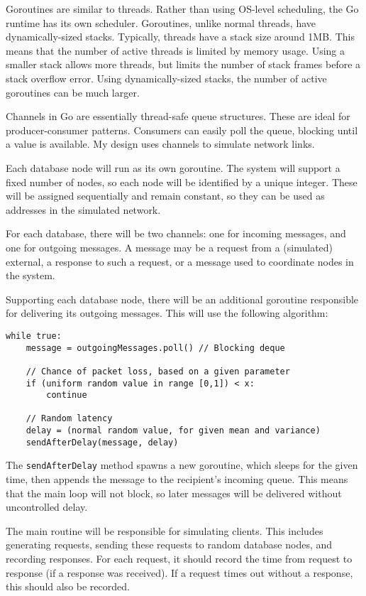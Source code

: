 \documentclass[12pt,a4paper]{article}
\begin{document}
Goroutines are similar to threads. Rather than using OS-level scheduling, the Go runtime has its own scheduler. Goroutines, unlike normal threads, have dynamically-sized stacks. Typically, threads have a stack size around 1MB. This means that the number of active threads is limited by memory usage. Using a smaller stack allows more threads, but limits the number of stack frames before a stack overflow error. Using dynamically-sized stacks, the number of active goroutines can be much larger.

Channels in Go are essentially thread-safe queue structures. These are ideal for producer-consumer patterns. Consumers can easily poll the queue, blocking until a value is available. My design uses channels to simulate network links.

Each database node will run as its own goroutine. The system will support a fixed number of nodes, so each node will be identified by a unique integer. These will be assigned sequentially and remain constant, so they can be used as addresses in the simulated network.

For each database, there will be two channels: one for incoming messages, and one for outgoing messages. A message may be a request from a (simulated) external, a response to such a request, or a message used to coordinate nodes in the system.


Supporting each database node, there will be an additional goroutine responsible for delivering its outgoing messages. This will use the following algorithm:

\begin{lstlisting}
while true:
    message = outgoingMessages.poll() // Blocking deque

    // Chance of packet loss, based on a given parameter
    if (uniform random value in range [0,1]) < x:
        continue

    // Random latency
    delay = (normal random value, for given mean and variance)
    sendAfterDelay(message, delay)
\end{lstlisting}

The \verb|sendAfterDelay| method spawns a new goroutine, which sleeps for the given time, then appends the message to the recipient's incoming queue. This means that the main loop will not block, so later messages will be delivered without uncontrolled delay.

The main routine will be responsible for simulating clients. This includes generating requests, sending these requests to random database nodes, and recording responses. For each request, it should record the time from request to response (if a response was received). If a request times out without a response, this should also be recorded.
\end{document}
